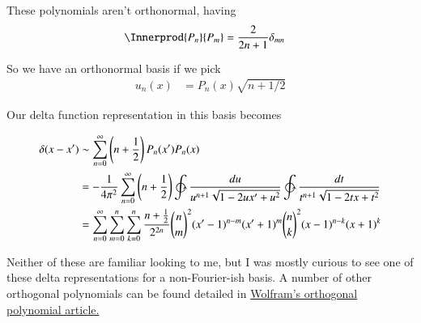 \documentclass{article}
\begin{document}
These polynomials aren't orthonormal, having 
\begin{align*}
\Innerprod{P_n}{P_m} &= \frac{2}{2 n + 1}\delta_{mn}
\end{align*}

So we have an orthonormal basis if we pick
\begin{align*}
u_n(x) &= P_n(x) \sqrt{n + 1/2}
\end{align*}

Our delta function representation in this basis becomes

\begin{align*}
\delta(x-x') 
&\sim \sum_{n=0}^\infty \left(n+ \inv{2}\right) P_n(x') P_n(x) \\
&= -\inv{4\pi^2} \sum_{n=0}^\infty \left(n+ \inv{2}\right) \ointctrclockwise \frac{du}{u^{n+1}\sqrt{1 - 2u x' + u^2}} \ointctrclockwise \frac{dt}{t^{n+1}\sqrt{1 - 2t x + t^2}} \\
&= \sum_{n=0}^\infty \sum_{m=0}^n \sum_{k=0}^n \frac{n+ \inv{2}}{2^{2n}} {\binom{n}{m}}^2 (x'-1)^{n-m}(x'+1)^m {\binom{n}{k}}^2 (x-1)^{n-k}(x+1)^k
\end{align*}

Neither of these are familiar looking to me, but I was mostly curious to see one of these delta representations for a non-Fourier-ish basis.  A number of other
orthogonal polynomials can be found detailed in \href{http://mathworld.wolfram.com/OrthogonalPolynomials.html}{Wolfram's orthogonal polynomial article.}



\end{document}
